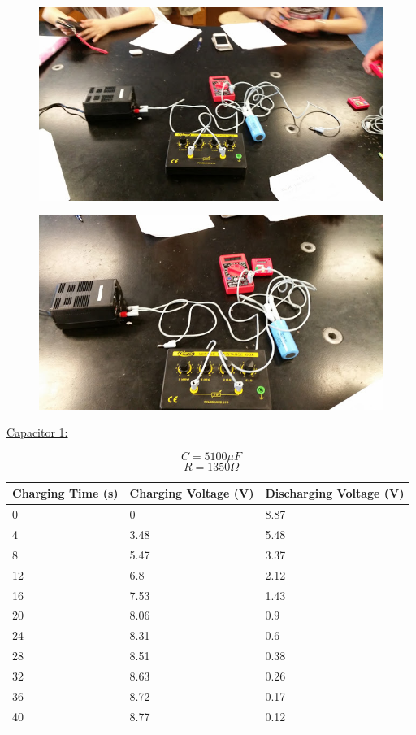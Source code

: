 \documentclass[11pt, titlepage]{article}
\begin{document}
\begin{figure}[h]
\centering
\hspace*{0cm}
\includegraphics[scale=0.6]{lab31.jpg}
\vspace*{0cm}
\end{figure}

\begin{figure}[h]
\centering
\hspace*{0cm}
\includegraphics[scale=0.6]{lab32.jpg}
\vspace*{0cm}
\end{figure}

\underline{Capacitor 1:}
\begin{center}
$$C = 5100 \mu F$$
$$R = 1350 \Omega$$
\begin{tabular}
{|m{9em}|m{9em}|m{9em}|}
\hline
Charging Time (s) & Charging Voltage (V) & Discharging Voltage (V) \\
\hline
0 & 0 & 8.87\\
\hline
4 & 3.48 & 5.48\\
\hline
8 & 5.47 & 3.37\\
\hline
12 & 6.8 & 2.12\\
\hline
16 & 7.53 & 1.43\\
\hline
20 & 8.06 & 0.9\\
\hline
24 & 8.31 & 0.6\\
\hline
28 & 8.51 & 0.38\\
\hline
32 & 8.63 & 0.26\\
\hline
36 & 8.72 & 0.17\\
\hline
40 & 8.77 & 0.12\\
\hline
\end{tabular}
\end{center}
\end{document}
